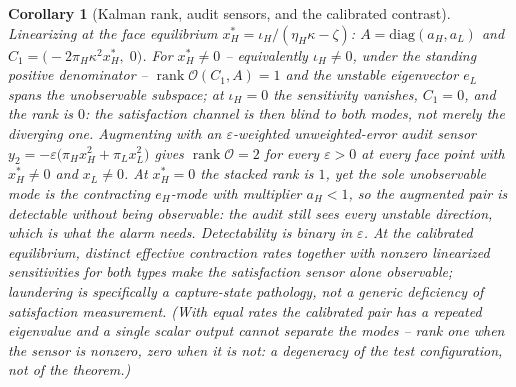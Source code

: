 \documentclass[11pt]{article}
\newtheorem{corollary}[theorem]{Corollary}
\theoremstyle{definition}
\theoremstyle{remark}
\numberwithin{equation}{section}
\DeclareMathOperator{\rk}{rank}
\begin{document}
\begin{corollary}[Kalman rank, audit sensors, and the calibrated contrast]\label{cor:kalman}
Linearizing at the face equilibrium $x_H^\ast=\iota_H/(\eta_H\kappa-\zeta)$: $A=\mathrm{diag}(a_H,a_L)$ and $C_1=\bigl(-2\pi_H\kappa^2x_H^\ast,\;0\bigr)$. For $x_H^\ast\ne0$ -- equivalently $\iota_H\ne0$, under the standing positive denominator -- $\rk\mathcal{O}(C_1,A)=1$ and the unstable eigenvector $e_L$ spans the unobservable subspace; at $\iota_H=0$ the sensitivity vanishes, $C_1=0$, and the rank is $0$: the satisfaction channel is then blind to \emph{both} modes, not merely the diverging one. Augmenting with an $\varepsilon$-weighted unweighted-error audit sensor $y_2=-\varepsilon\bigl(\pi_Hx_H^2+\pi_Lx_L^2\bigr)$ gives $\rk\mathcal{O}=2$ for every $\varepsilon>0$ at every face point with $x_H^\ast\ne0$ and $x_L\ne0$. At $x_H^\ast=0$ the stacked rank is $1$, yet the sole unobservable mode is the contracting $e_H$-mode with multiplier $a_H<1$, so the augmented pair is \emph{detectable} without being observable: the audit still sees every unstable direction, which is what the alarm needs. Detectability is binary in $\varepsilon$. At the \emph{calibrated} equilibrium, distinct effective contraction rates together with nonzero linearized sensitivities for both types make the satisfaction sensor alone observable; laundering is specifically a capture-state pathology, not a generic deficiency of satisfaction measurement. (With equal rates the calibrated pair has a repeated eigenvalue and a single scalar output cannot separate the modes -- rank one when the sensor is nonzero, zero when it is not: a degeneracy of the test configuration, not of the theorem.)
\end{corollary}
\end{document}

